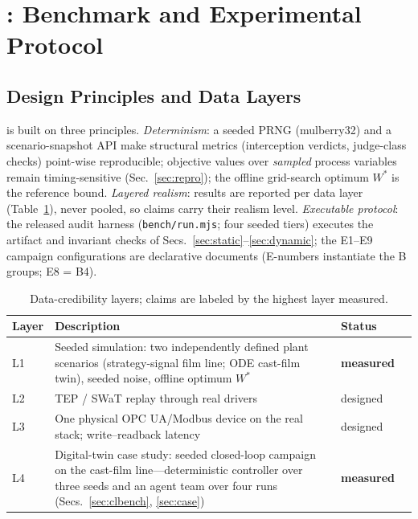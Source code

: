 \section{\bench{}: Benchmark and Experimental Protocol}
\label{sec:bench}

\subsection{Design Principles and Data Layers}
\bench{} is built on three principles. \emph{Determinism}: a seeded PRNG (mulberry32) and a scenario-snapshot API make structural metrics (interception verdicts, judge-class checks) point-wise reproducible; objective values over \emph{sampled} process variables remain timing-sensitive (Sec.~\ref{sec:repro}); the offline grid-search optimum $W^{*}$ is the reference bound. \emph{Layered realism}: results are reported per data layer (Table~\ref{tab:layers}), never pooled, so claims carry their realism level. \emph{Executable protocol}: the released audit harness (\texttt{bench/run.mjs}; four seeded tiers) executes the artifact and invariant checks of Secs.~\ref{sec:static}--\ref{sec:dynamic}; the E1--E9 campaign configurations are declarative documents (E-numbers instantiate the B groups; E8 = B4).

\begin{table}[!t]
\centering
\caption{Data-credibility layers; claims are labeled by the highest layer measured.}
\label{tab:layers}
\scriptsize
\begin{tabular}{@{}lp{4.6cm}lc@{}}
\toprule
Layer & Description & Status \\
\midrule
L1 & Seeded simulation: two independently defined plant scenarios (strategy-signal film line; ODE cast-film twin), seeded noise, offline optimum $W^{*}$ & \textbf{measured} \\
L2 & TEP \cite{downs1993tep} / SWaT \cite{goh2017swat} replay through real drivers & designed \\
L3 & One physical OPC UA/Modbus device on the real stack; write--readback latency & designed \\
L4 & Digital-twin case study: seeded closed-loop campaign on the cast-film line---deterministic controller over three seeds and an agent team over four runs (Secs.~\ref{sec:clbench}, \ref{sec:case}) & \textbf{measured} \\
\bottomrule
\end{tabular}
\end{table}

